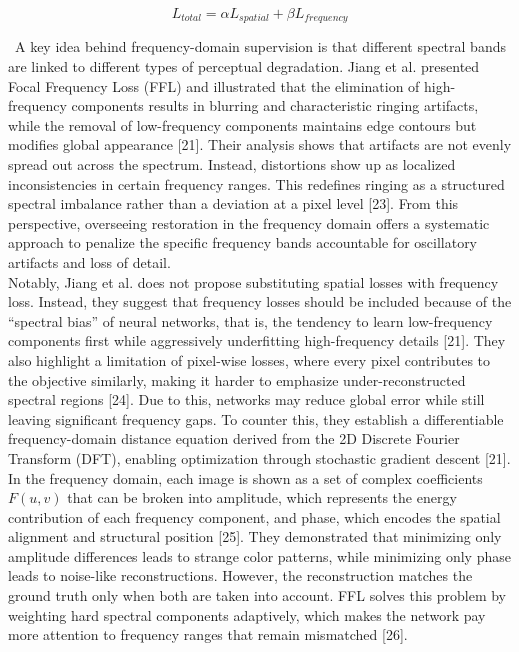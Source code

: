 \documentclass[12pt]{article}
\begin{document}
$$    L_{total}  = \alpha L_{spatial} + \beta L_{frequency} $$


\quad \, A key idea behind frequency-domain supervision is that different spectral bands are linked to different types of perceptual degradation. Jiang et al. presented Focal Frequency Loss (FFL) and illustrated that the elimination of high-frequency components results in blurring and characteristic ringing artifacts, while the removal of low-frequency components maintains edge contours but modifies global appearance [21]. Their analysis shows that artifacts are not evenly spread out across the spectrum. Instead, distortions show up as localized inconsistencies in certain frequency ranges. This redefines ringing as a structured spectral imbalance rather than a deviation at a pixel level [23]. From this perspective, overseeing restoration in the frequency domain offers a systematic approach to penalize the specific frequency bands accountable for oscillatory artifacts and loss of detail. \\

Notably, Jiang et al. does not propose substituting spatial losses with frequency loss. Instead, they suggest that frequency losses should be included because of the ``spectral bias'' of neural networks, that is, the tendency to learn low-frequency components first while aggressively underfitting high-frequency details [21]. They also highlight a limitation of pixel-wise losses, where every pixel contributes to the objective similarly, making it harder to emphasize under-reconstructed spectral regions [24]. Due to this, networks may reduce global error while still leaving significant frequency gaps. To counter this, they establish a differentiable frequency-domain distance equation derived from the 2D Discrete Fourier Transform (DFT), enabling optimization through stochastic gradient descent [21]. \\

In the frequency domain, each image is shown as a set of complex coefficients $F(u,v)$ that can be broken into amplitude, which represents the energy contribution of each frequency component, and phase, which encodes the spatial alignment and structural position [25]. They demonstrated that minimizing only amplitude differences leads to strange color patterns, while minimizing only phase leads to noise-like reconstructions. However, the reconstruction matches the ground truth only when both are taken into account. FFL solves this problem by weighting hard spectral components adaptively, which makes the network pay more attention to frequency ranges that remain mismatched [26]. \\
\end{document}
